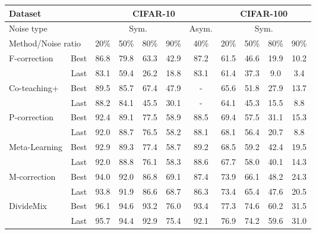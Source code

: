 \documentclass[letterpaper]{article} \usepackage{aaai23}  \usepackage{times}  \usepackage{helvet}  \usepackage{courier}  \usepackage[hyphens]{url}  \usepackage{graphicx} \urlstyle{rm} \def\UrlFont{\rm}  \usepackage{natbib}  \usepackage{caption} \frenchspacing  \setlength{\pdfpagewidth}{8.5in} \setlength{\pdfpageheight}{11in} \usepackage{algorithm}
\begin{document}
\begin{table*}
    \centering
    \begin{tabular}{lr|c|c|c|c|c||c|c|c|c}
        \toprule
		Dataset               &      &\multicolumn{5}{c||}{CIFAR-10}& \multicolumn{4}{c}{CIFAR-100}\\\midrule Noise type &      &\multicolumn{4}{c|}{Sym.}& \multicolumn{1}{c||}{Asym.} & \multicolumn{4}{c}{Sym.}\\\midrule
		\multicolumn{2}{l|}{Method/Noise ratio}        & 20\% & 50\% & 80\% & 90\% & 40\% & 20\% & 50\% & 80\% &  90\% \\ \midrule \multirow{2}{*}{F-correction \cite{patrini2017making}}          & Best  & 86.8 & 79.8 & 63.3 & 42.9 & 87.2 & 61.5 & 46.6 & 19.9 & 10.2 \\
		                                       & Last  & 83.1 & 59.4 & 26.2 & 18.8 & 83.1 & 61.4 & 37.3 &  9.0 &  3.4 \\ \midrule
		\multirow{2}{*}{Co-teaching+ \cite{yu2019does}}          & Best  & 89.5 & 85.7 & 67.4 & 47.9 &  -   & 65.6 & 51.8 & 27.9 & 13.7 \\
		                                       & Last  & 88.2 & 84.1 & 45.5 & 30.1 &  -   & 64.1 & 45.3 & 15.5 &  8.8 \\ \midrule
		\multirow{2}{*}{P-correction \cite{yi2019probabilistic}}          & Best  & 92.4 & 89.1 & 77.5 & 58.9 & 88.5 & 69.4 & 57.5 & 31.1 & 15.3 \\
		                                       & Last  & 92.0 & 88.7 & 76.5 & 58.2 & 88.1 & 68.1 & 56.4 & 20.7 &  8.8 \\\midrule
		\multirow{2}{*}{Meta-Learning \cite{li2019learning}}         & Best  & 92.9 & 89.3 & 77.4 & 58.7 & 89.2 & 68.5 & 59.2 & 42.4 & 19.5 \\
		                                       & Last  & 92.0 & 88.8 & 76.1 & 58.3 & 88.6 & 67.7 & 58.0 & 40.1 & 14.3 \\\midrule
		\multirow{2}{*}{M-correction \cite{arazo2019unsupervised}}          & Best  & 94.0 & 92.0 & 86.8 & 69.1 & 87.4 & 73.9 & 66.1 & 48.2 & 24.3 \\
		                                       & Last  & 93.8 & 91.9 & 86.6 & 68.7 & 86.3 & 73.4 & 65.4 & 47.6 & 20.5 \\\midrule
		\multirow{2}{*}{DivideMix  \cite{li2020dividemix}}             & Best  & 96.1 & 94.6 & 93.2 & 76.0 & 93.4 & 77.3 & 74.6 & 60.2 & 31.5 \\
				                               & Last  & 95.7 & 94.4 & 92.9 & 75.4 & 92.1 & 76.9 & 74.2 & 59.6 & 31.0 \\\midrule

\end{tabular}
\end{table*}
\end{document}

